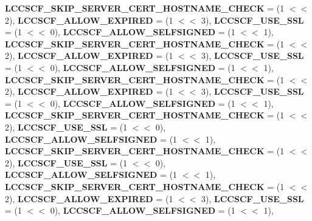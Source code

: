 \begin{DoxyCompactItemize}
{\bfseries L\+C\+C\+S\+C\+F\+\_\+\+S\+K\+I\+P\+\_\+\+S\+E\+R\+V\+E\+R\+\_\+\+C\+E\+R\+T\+\_\+\+H\+O\+S\+T\+N\+A\+M\+E\+\_\+\+C\+H\+E\+CK} = (1 $<$$<$ 2), 
{\bfseries L\+C\+C\+S\+C\+F\+\_\+\+A\+L\+L\+O\+W\+\_\+\+E\+X\+P\+I\+R\+ED} = (1 $<$$<$ 3), 
\newline
{\bfseries L\+C\+C\+S\+C\+F\+\_\+\+U\+S\+E\+\_\+\+S\+SL} = (1 $<$$<$ 0), 
{\bfseries L\+C\+C\+S\+C\+F\+\_\+\+A\+L\+L\+O\+W\+\_\+\+S\+E\+L\+F\+S\+I\+G\+N\+ED} = (1 $<$$<$ 1), 
{\bfseries L\+C\+C\+S\+C\+F\+\_\+\+S\+K\+I\+P\+\_\+\+S\+E\+R\+V\+E\+R\+\_\+\+C\+E\+R\+T\+\_\+\+H\+O\+S\+T\+N\+A\+M\+E\+\_\+\+C\+H\+E\+CK} = (1 $<$$<$ 2), 
{\bfseries L\+C\+C\+S\+C\+F\+\_\+\+A\+L\+L\+O\+W\+\_\+\+E\+X\+P\+I\+R\+ED} = (1 $<$$<$ 3), 
\newline
{\bfseries L\+C\+C\+S\+C\+F\+\_\+\+U\+S\+E\+\_\+\+S\+SL} = (1 $<$$<$ 0), 
{\bfseries L\+C\+C\+S\+C\+F\+\_\+\+A\+L\+L\+O\+W\+\_\+\+S\+E\+L\+F\+S\+I\+G\+N\+ED} = (1 $<$$<$ 1), 
{\bfseries L\+C\+C\+S\+C\+F\+\_\+\+S\+K\+I\+P\+\_\+\+S\+E\+R\+V\+E\+R\+\_\+\+C\+E\+R\+T\+\_\+\+H\+O\+S\+T\+N\+A\+M\+E\+\_\+\+C\+H\+E\+CK} = (1 $<$$<$ 2), 
{\bfseries L\+C\+C\+S\+C\+F\+\_\+\+A\+L\+L\+O\+W\+\_\+\+E\+X\+P\+I\+R\+ED} = (1 $<$$<$ 3), 
\newline
{\bfseries L\+C\+C\+S\+C\+F\+\_\+\+U\+S\+E\+\_\+\+S\+SL} = (1 $<$$<$ 0), 
{\bfseries L\+C\+C\+S\+C\+F\+\_\+\+A\+L\+L\+O\+W\+\_\+\+S\+E\+L\+F\+S\+I\+G\+N\+ED} = (1 $<$$<$ 1), 
{\bfseries L\+C\+C\+S\+C\+F\+\_\+\+S\+K\+I\+P\+\_\+\+S\+E\+R\+V\+E\+R\+\_\+\+C\+E\+R\+T\+\_\+\+H\+O\+S\+T\+N\+A\+M\+E\+\_\+\+C\+H\+E\+CK} = (1 $<$$<$ 2), 
{\bfseries L\+C\+C\+S\+C\+F\+\_\+\+U\+S\+E\+\_\+\+S\+SL} = (1 $<$$<$ 0), 
\newline
{\bfseries L\+C\+C\+S\+C\+F\+\_\+\+A\+L\+L\+O\+W\+\_\+\+S\+E\+L\+F\+S\+I\+G\+N\+ED} = (1 $<$$<$ 1), 
{\bfseries L\+C\+C\+S\+C\+F\+\_\+\+S\+K\+I\+P\+\_\+\+S\+E\+R\+V\+E\+R\+\_\+\+C\+E\+R\+T\+\_\+\+H\+O\+S\+T\+N\+A\+M\+E\+\_\+\+C\+H\+E\+CK} = (1 $<$$<$ 2), 
{\bfseries L\+C\+C\+S\+C\+F\+\_\+\+U\+S\+E\+\_\+\+S\+SL} = (1 $<$$<$ 0), 
{\bfseries L\+C\+C\+S\+C\+F\+\_\+\+A\+L\+L\+O\+W\+\_\+\+S\+E\+L\+F\+S\+I\+G\+N\+ED} = (1 $<$$<$ 1), 
\newline
{\bfseries L\+C\+C\+S\+C\+F\+\_\+\+S\+K\+I\+P\+\_\+\+S\+E\+R\+V\+E\+R\+\_\+\+C\+E\+R\+T\+\_\+\+H\+O\+S\+T\+N\+A\+M\+E\+\_\+\+C\+H\+E\+CK} = (1 $<$$<$ 2), 
{\bfseries L\+C\+C\+S\+C\+F\+\_\+\+A\+L\+L\+O\+W\+\_\+\+E\+X\+P\+I\+R\+ED} = (1 $<$$<$ 3), 
{\bfseries L\+C\+C\+S\+C\+F\+\_\+\+U\+S\+E\+\_\+\+S\+SL} = (1 $<$$<$ 0), 
{\bfseries L\+C\+C\+S\+C\+F\+\_\+\+A\+L\+L\+O\+W\+\_\+\+S\+E\+L\+F\+S\+I\+G\+N\+ED} = (1 $<$$<$ 1), 
\newline

\end{DoxyCompactItemize}
